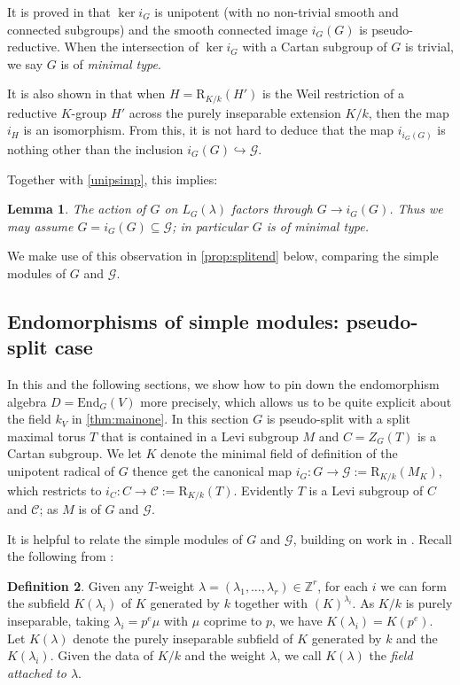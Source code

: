 \documentclass[11pt,reqno]{amsart}
\newtheorem{lemma}{Lemma}[subsection]
\theoremstyle{definition}
\theoremstyle{remark}
\theoremstyle{definition}
\newtheorem{defn}[lemma]{Definition}
\theoremstyle{plain}
\newcommand{\R}{\mathrm{R}}
\newcommand{\G}{\mathscr{G}}
\newcommand{\End}{\mathrm{End}}
\newcommand{\Z}{\mathbb{Z}}
\newcommand{\C}{\mathscr{C}}
\begin{document}
It is proved in \cite[Prop 7.1.3(ii)]{CPSurv} that $\ker i_G$ is unipotent (with no non-trivial smooth and connected subgroups) and the smooth connected image $i_G(G)$ is pseudo-reductive. When the intersection of $\ker i_G$ with a Cartan subgroup of $G$ is trivial, we say $G$ is of \emph{minimal type}.


It is also shown in \cite[Thm. 1.6.2(2)]{CGP15} that when $H = \R_{K/k}(H')$ is the Weil restriction of a reductive $K$-group $H'$ across the purely inseparable extension $K/k$, then the map $i_H$ is an isomorphism.
From this, it is not hard to deduce that  the map $i_{i_G(G)}$ is nothing other than the inclusion $i_G(G)\hookrightarrow \G$. 

Together with \cref{unipsimp}, this implies:
\begin{lemma}\label{lem:i_G}
  The action of $G$ on $L_G(\lambda)$ factors through $G\to i_G(G)$. Thus we may assume $G=i_G(G)\subseteq \G$; in particular $G$ is of minimal type.
\end{lemma}

We make use of this observation in \cref{prop:splitend} below, comparing the simple modules of $G$ and $\G$.

\subsection{Endomorphisms of simple modules: pseudo-split case}\label{sec:endsimple1} 
In this and the following sections, we show how to pin down the endomorphism algebra $D = \End_G(V)$ more precisely, which allows us to be quite explicit about the field $k_V$ in \cref{thm:mainone}. In this section $G$ is pseudo-split with  a split maximal torus $T$ that is contained in a Levi subgroup $M$ and $C=Z_G(T)$ is a Cartan subgroup. We let $K$ denote the minimal field of definition of the unipotent radical of $G$ thence get the canonical map $i_G:G\to\G:=\R_{K/k}(M_K)$, which restricts to $i_C:C\to\C:=\R_{K/k}(T)$. Evidently $T$ is a Levi subgroup of $C$ and $\C$; as $M$ is of $G$ and $\G$. 

It is helpful to relate the simple modules of $G$ and $\G$, building on work in \cite{BS22}.  Recall the following from \cite[Sec.~1]{BS22}:
\begin{defn}\label{def:Klambda}
Given any $T$-weight $\lambda = (\lambda_1,\ldots,\lambda_r)\in\Z^r$, for each $i$ we can form the subfield $K(\lambda_i)$ of $K$ 
generated by $k$ together with $(K)^{\lambda_i}$. 
As $K/k$ is purely inseparable, taking $\lambda_i = p^e\mu$ with $\mu$ coprime to $p$, we have $K(\lambda_i) = K(p^e)$.
Let $K(\lambda)$ denote the purely inseparable subfield of $K$ generated by $k$ and the $K(\lambda_i)$.
Given the data of $K/k$ and the weight $\lambda$, we call $K(\lambda)$ the \emph{field attached to $\lambda$}.
\end{defn}
\end{document}
